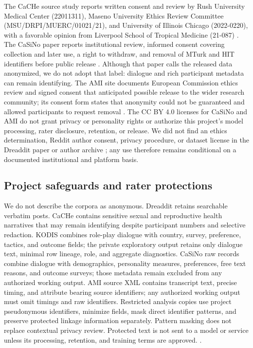 The CaCHe source study reports written consent and review by Rush University Medical Center (22011311), Maseno University Ethics Review Committee (MSU/DRPI/MUERC/01021/21), and University of Illinois Chicago (2022-0220), with a favorable opinion from Liverpool School of Tropical Medicine (21-087) \citep{awiti2024agyw}. The CaSiNo paper reports institutional review, informed consent covering collection and later use, a right to withdraw, and removal of MTurk and HIT identifiers before public release \citep{chawla2021casino}. Although that paper calls the released data anonymized, we do not adopt that label: dialogue and rich participant metadata can remain identifying. The AMI site documents European Commission ethics review and signed consent that anticipated possible release to the wider research community; its consent form states that anonymity could not be guaranteed and allowed participants to request removal \citep{amietics}. The CC BY 4.0 licenses for CaSiNo and AMI do not grant privacy or personality rights or authorize this project's model processing, rater disclosure, retention, or release. We did not find an ethics determination, Reddit author consent, privacy procedure, or dataset license in the Dreaddit paper or author archive \citep{turcan2019dreaddit}; any use therefore remains conditional on a documented institutional and platform basis.

\subsection{Project safeguards and rater protections}

We do not describe the corpora as anonymous. Dreaddit retains searchable verbatim posts. CaCHe contains sensitive sexual and reproductive health narratives that may remain identifying despite participant numbers and selective redaction. KODIS combines role-play dialogue with country, survey, preference, tactics, and outcome fields; the private exploratory output retains only dialogue text, minimal row lineage, role, and aggregate diagnostics. CaSiNo raw records combine dialogue with demographics, personality measures, preferences, free text reasons, and outcome surveys; those metadata remain excluded from any authorized working output. AMI source XML contains transcript text, precise timing, and attribute bearing source identifiers; any authorized working output must omit timings and raw identifiers. Restricted analysis copies use project pseudonymous identifiers, minimize fields, mask direct identifier patterns, and preserve protected linkage information separately. Pattern masking does not replace contextual privacy review. Protected text is not sent to a model or service unless its processing, retention, and training terms are approved. .

